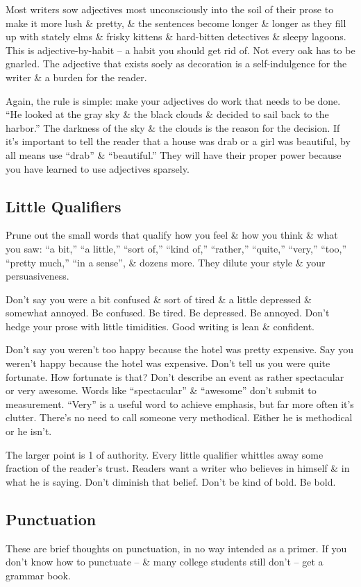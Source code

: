 \documentclass{article}
\begin{document}
Most writers sow adjectives most unconsciously into the soil of their prose to make it more lush \& pretty, \& the sentences become longer \& longer as they fill up with stately elms \& frisky kittens \& hard-bitten detectives \& sleepy lagoons. This is adjective-by-habit -- a habit you should get rid of. Not every oak has to be gnarled. The adjective that exists soely as decoration is a self-indulgence for the writer \& a burden for the reader.

Again, the rule is simple: make your adjectives do work that needs to be done. ``He looked at the gray sky \& the black clouds \& decided to sail back to the harbor.'' The darkness of the sky \& the clouds is the reason for the decision. If it's important to tell the reader that a house was drab or a girl was beautiful, by all means use ``drab'' \& ``beautiful.'' They will have their proper power because you have learned to use adjectives sparsely.

\subsection{Little Qualifiers}
Prune out the small words that qualify how you feel \& how you think \& what you saw: ``a bit,'' ``a little,'' ``sort of,'' ``kind of,'' ``rather,'' ``quite,'' ``very,'' ``too,'' ``pretty much,'' ``in a sense'', \& dozens more. They dilute your style \& your persuasiveness.

Don't say you were a bit confused \& sort of tired \& a little depressed \& somewhat annoyed. Be confused. Be tired. Be depressed. Be annoyed. Don't hedge your prose with little timidities. Good writing is lean \& confident.

Don't say you weren't too happy because the hotel was pretty expensive. Say you weren't happy because the hotel was expensive. Don't tell us you were quite fortunate. How fortunate is that? Don't describe an event as rather spectacular or very awesome. Words like ``spectacular'' \& ``awesome'' don't submit to measurement. ``Very'' is a useful word to achieve emphasis, but far more often it's clutter. There's no need to call someone very methodical. Either he is methodical or he isn't.

The larger point is 1 of authority. Every little qualifier whittles away some fraction of the reader's trust. Readers want a writer who believes in himself \& in what he is saying. Don't diminish that belief. Don't be kind of bold. Be bold.

\subsection{Punctuation}
These are brief thoughts on punctuation, in no way intended as a primer. If you don't know how to punctuate -- \& many college students still don't -- get a grammar book.
\end{document}
